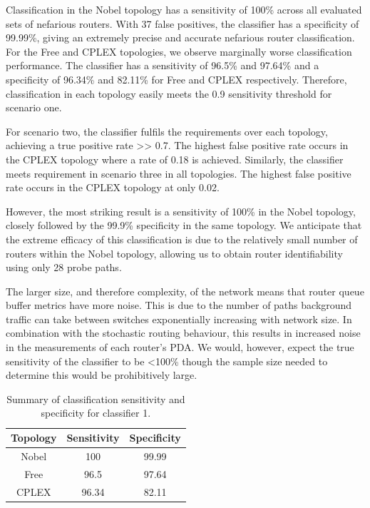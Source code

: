 Classification in the Nobel topology has a sensitivity of 100\% across all evaluated sets of nefarious routers. With 37 false positives, the classifier has a specificity of 99.99\%, giving an extremely precise and accurate nefarious router classification. For the Free and CPLEX topologies, we observe marginally worse classification performance. The classifier has a sensitivity of 96.5\% and 97.64\% and a specificity of 96.34\% and 82.11\% for Free and CPLEX respectively. Therefore, classification in each topology easily meets the 0.9 sensitivity threshold for scenario one.\par
For scenario two, the classifier fulfils the requirements over each topology, achieving a true positive rate >> 0.7. The highest false positive rate occurs in the CPLEX topology where a rate of 0.18 is achieved. Similarly, the classifier meets requirement in scenario three in all topologies. The highest false positive rate occurs in the CPLEX topology at only 0.02.\par
However, the most striking result is a sensitivity of 100\% in the Nobel topology, closely followed by the 99.9\% specificity in the same topology. We anticipate that the extreme efficacy of this classification is due to the relatively small number of routers within the Nobel topology, allowing us to obtain router identifiability using only 28 probe paths.\par
The larger size, and therefore complexity, of the network means that router queue buffer metrics have more noise. This is due to the number of paths background traffic can take between switches exponentially increasing with network size. In combination with the stochastic routing behaviour, this results in increased noise in the measurements of each router's PDA. We would, however, expect the true sensitivity of the classifier to be <100\% though the sample size needed to determine this would be prohibitively large.\par
\begin{table}[t]
    \centering
    \begin{tabular}{ccc}
        Topology & Sensitivity & Specificity\\
        \midrule
        Nobel & 100   & 99.99 \\
        Free  & 96.5  & 97.64 \\
        CPLEX & 96.34 & 82.11 \\
    \end{tabular}
    \caption{Summary of classification sensitivity and specificity for classifier 1.}
    \label{tbl:Rassumptionset1summary}
\end{table}
